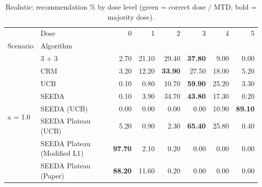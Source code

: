 \begin{table}[H]
\centering
\caption{Realistic: recommendation \% by dose level (green = correct dose / MTD, bold = majority dose).}
\label{tab:real_rec_by_dose}
\begin{tabular}{llrrrrrr}
\toprule
 & Dose & 0 & 1 & 2 & 3 & 4 & 5 \\
Scenario & Algorithm &  &  &  &  &  &  \\
\midrule
\multirow[c]{8}{*}{a = 1.0} & 3 + 3 & 2.70 & 21.10 & {\cellcolor[HTML]{C8E6C9}} 29.40 & \bfseries 37.80 & 9.00 & 0.00 \\
 & CRM & 3.20 & 12.20 & {\cellcolor[HTML]{C8E6C9}} \bfseries 33.90 & 27.50 & 18.00 & 5.20 \\
 & UCB & 0.10 & 0.80 & {\cellcolor[HTML]{C8E6C9}} 10.70 & \bfseries 59.90 & 25.20 & 3.30 \\
 & SEEDA & 0.10 & 3.90 & {\cellcolor[HTML]{C8E6C9}} 34.70 & \bfseries 43.80 & 17.30 & 0.20 \\
 & SEEDA (UCB) & 0.00 & 0.00 & {\cellcolor[HTML]{C8E6C9}} 0.00 & 0.00 & 10.90 & \bfseries 89.10 \\
 & SEEDA Plateau (UCB) & 5.20 & 0.90 & {\cellcolor[HTML]{C8E6C9}} 2.30 & \bfseries 65.40 & 25.80 & 0.40 \\
 & SEEDA Plateau (Modified L1) & \bfseries 97.70 & 2.10 & {\cellcolor[HTML]{C8E6C9}} 0.20 & 0.00 & 0.00 & 0.00 \\
 & SEEDA Plateau (Paper) & \bfseries 88.20 & 11.60 & {\cellcolor[HTML]{C8E6C9}} 0.20 & 0.00 & 0.00 & 0.00 \\
\bottomrule
\end{tabular}
\end{table}
